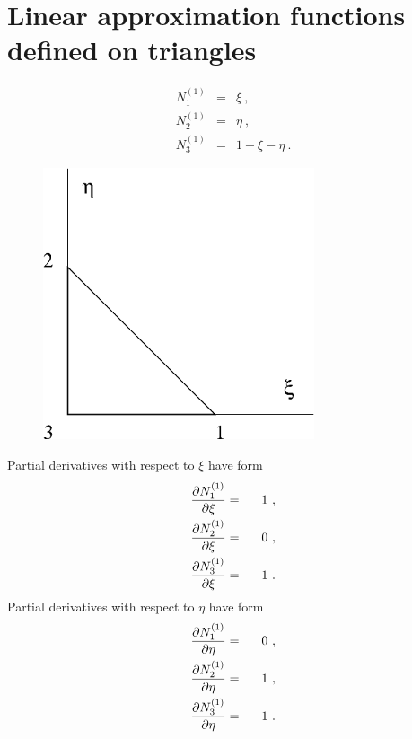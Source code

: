 \section{Linear approximation functions defined on triangles}
\begin{eqnarray}
\label{bflintrn1}
N_1^{(1)} &=& \xi\ ,
\\
\label{bflintrn2}
N_2^{(1)} &=& \eta\ ,
\\
\label{bflintrn3}
N_3^{(1)} &=& 1 - \xi - \eta\ .
\end{eqnarray}
\begin{figure}
\begin{center}
\includegraphics[width=80mm]{FIG/lintriang.eps}
\end{center}
\end{figure}
Partial derivatives with respect to $\xi$ have form
\begin{eqnarray}
\label{bflintrdx1}
\mbox{$\displaystyle\frac{\partial{N_1^{(1)}}}{\partial{\xi}}$} &=& 1\ ,
\\
\label{bflintrdx2}
\mbox{$\displaystyle\frac{\partial{N_2^{(1)}}}{\partial{\xi}}$} &=& 0\ ,
\\
\label{bflintrdx3}
\mbox{$\displaystyle\frac{\partial{N_3^{(1)}}}{\partial{\xi}}$} &=& - 1\ .
\end{eqnarray}
Partial derivatives with respect to $\eta$ have form
\begin{eqnarray}
\label{bflintrdy1}
\mbox{$\displaystyle\frac{\partial{N_1^{(1)}}}{\partial{\eta}}$} &=& 0\ ,
\\
\label{bflintrdy2}
\mbox{$\displaystyle\frac{\partial{N_2^{(1)}}}{\partial{\eta}}$} &=& 1\ ,
\\
\label{bflintrdy3}
\mbox{$\displaystyle\frac{\partial{N_3^{(1)}}}{\partial{\eta}}$} &=& - 1\ .
\end{eqnarray}


